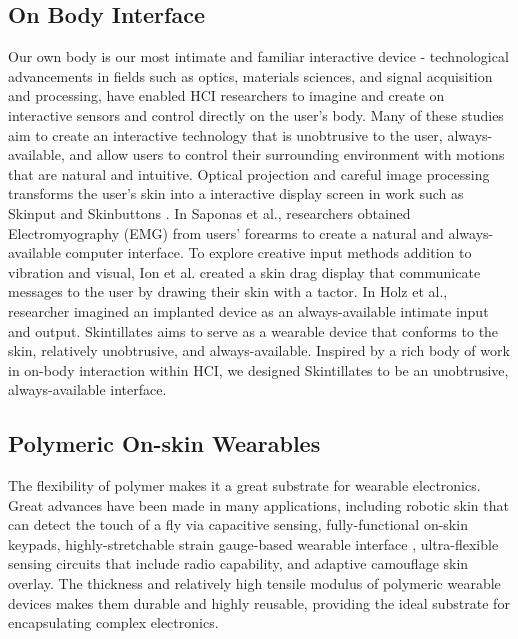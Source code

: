 \documentclass{sigchi}
\begin{document}
\subsection{On Body Interface}
Our own body is our most intimate and familiar interactive device - technological advancements in fields such as optics, materials sciences, and signal acquisition and processing, have enabled HCI researchers to imagine and create on interactive sensors and control directly on the user's body. Many of these studies aim to create an interactive technology that is unobtrusive to the user, always- available, and allow users to control their surrounding environment with motions that are natural and intuitive. Optical projection and careful image processing transforms the user's skin into a interactive display screen in work such as Skinput and Skinbuttons \cite{ChrisHarrison:2010vi, Laput:2014du}. In Saponas et al., researchers obtained Electromyography (EMG) from users' forearms to create a natural and always-available computer interface\cite{Anonymous:2009ua}. To explore creative input methods addition to vibration and visual, Ion et al. created a skin drag display that communicate messages to the user by drawing their skin with a tactor\cite{Ion:2015ig}. In Holz et al., researcher imagined an implanted device as an always-available intimate input and output. Skintillates aims to serve as a wearable device that conforms to the skin, relatively unobtrusive, and always-available. Inspired by a rich body of work in on-body interaction within HCI, we designed Skintillates to be an unobtrusive, always-available interface. 

\subsection{Polymeric On-skin Wearables}
The flexibility of polymer makes it a great substrate for wearable electronics. Great advances have been made in many applications, including robotic skin that can detect the touch of a fly via capacitive sensing\cite{Mannsfeld:2010is}, fully-functional on-skin keypads\cite{Anonymous:L82kTfjJ}, highly-stretchable strain gauge-based wearable interface \cite{Boley:2014dr,Muth:2014bv}, ultra-flexible sensing circuits that include radio capability\cite{Jang:1gb,Anonymous:BBKIC9BZ}, and adaptive camouflage skin overlay\cite{Yu:2014ht}. The thickness and relatively high tensile modulus of polymeric wearable devices makes them durable and highly reusable, providing the ideal substrate for encapsulating complex electronics.
\end{document}
